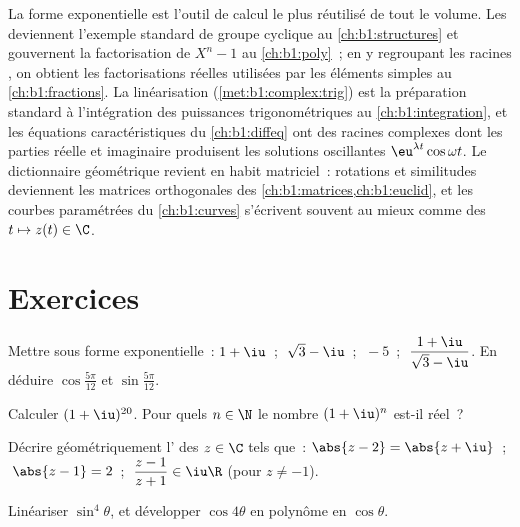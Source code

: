 \begin{remark}\label{rem:b1:complex:whereused}
La forme exponentielle est l'outil de calcul le plus réutilisé de
tout le volume. Les  deviennent l'exemple standard
de groupe cyclique au \cref{ch:b1:structures} et gouvernent la
factorisation de $X^n - 1$ au \cref{ch:b1:poly}~; en y regroupant
les racines , on obtient les factorisations réelles
utilisées par les éléments simples au \cref{ch:b1:fractions}. La
linéarisation (\cref{met:b1:complex:trig}) est la préparation
standard à l'intégration des puissances trigonométriques au
\cref{ch:b1:integration}, et les équations caractéristiques du
\cref{ch:b1:diffeq} ont des racines complexes dont les parties
réelle et imaginaire produisent les solutions oscillantes
$\eu^{\lambda t}\cos\omega t$. Le dictionnaire géométrique revient
en habit matriciel~: rotations et similitudes deviennent les
matrices orthogonales des \cref{ch:b1:matrices,ch:b1:euclid}, et les
courbes paramétrées du \cref{ch:b1:curves} s'écrivent souvent au
mieux comme des  $t \mapsto z(t) \in \C$.
\end{remark}

\section{Exercices}

\begin{exercise}[$\star$]\label{exo:b1:complex:1}
Mettre sous forme exponentielle~: $1 + \iu$~; $\;\sqrt 3 - \iu$~;
$\;-5$~; $\;\dfrac{1 + \iu}{\sqrt 3 - \iu}$. En déduire
$\cos\frac{5\pi}{12}$ et $\sin\frac{5\pi}{12}$.
\end{exercise}

\begin{exercise}[$\star$]\label{exo:b1:complex:2}
Calculer $(1 + \iu)^{20}$. Pour quels $n \in \N$ le nombre $(1 +
\iu)^n$ est-il réel~?
\end{exercise}

\begin{exercise}[$\star$]\label{exo:b1:complex:3}
Décrire géométriquement l' des $z \in \C$ tels que~:
$\abs{z - 2} = \abs{z + \iu}$~; $\;\abs{z - 1} = 2$~;
$\;\dfrac{z - 1}{z + 1} \in \iu\R$ (pour $z \neq -1$).
\end{exercise}

\begin{exercise}[$\star$]\label{exo:b1:complex:4}
Linéariser $\sin^4\theta$, et développer $\cos 4\theta$ en polynôme en
$\cos\theta$.
\end{exercise}

